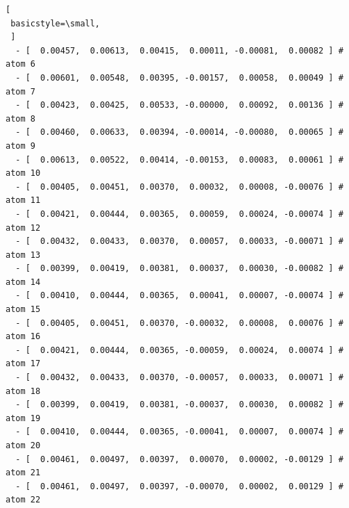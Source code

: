 \documentclass[12pt,a4paper]{article}
\begin{document}
\begin{lstlisting}[
 basicstyle=\small,
 ]
  - [  0.00457,  0.00613,  0.00415,  0.00011, -0.00081,  0.00082 ] # atom 6
  - [  0.00601,  0.00548,  0.00395, -0.00157,  0.00058,  0.00049 ] # atom 7
  - [  0.00423,  0.00425,  0.00533, -0.00000,  0.00092,  0.00136 ] # atom 8
  - [  0.00460,  0.00633,  0.00394, -0.00014, -0.00080,  0.00065 ] # atom 9
  - [  0.00613,  0.00522,  0.00414, -0.00153,  0.00083,  0.00061 ] # atom 10
  - [  0.00405,  0.00451,  0.00370,  0.00032,  0.00008, -0.00076 ] # atom 11
  - [  0.00421,  0.00444,  0.00365,  0.00059,  0.00024, -0.00074 ] # atom 12
  - [  0.00432,  0.00433,  0.00370,  0.00057,  0.00033, -0.00071 ] # atom 13
  - [  0.00399,  0.00419,  0.00381,  0.00037,  0.00030, -0.00082 ] # atom 14
  - [  0.00410,  0.00444,  0.00365,  0.00041,  0.00007, -0.00074 ] # atom 15
  - [  0.00405,  0.00451,  0.00370, -0.00032,  0.00008,  0.00076 ] # atom 16
  - [  0.00421,  0.00444,  0.00365, -0.00059,  0.00024,  0.00074 ] # atom 17
  - [  0.00432,  0.00433,  0.00370, -0.00057,  0.00033,  0.00071 ] # atom 18
  - [  0.00399,  0.00419,  0.00381, -0.00037,  0.00030,  0.00082 ] # atom 19
  - [  0.00410,  0.00444,  0.00365, -0.00041,  0.00007,  0.00074 ] # atom 20
  - [  0.00461,  0.00497,  0.00397,  0.00070,  0.00002, -0.00129 ] # atom 21
  - [  0.00461,  0.00497,  0.00397, -0.00070,  0.00002,  0.00129 ] # atom 22  
 \end{lstlisting}
\end{document}
